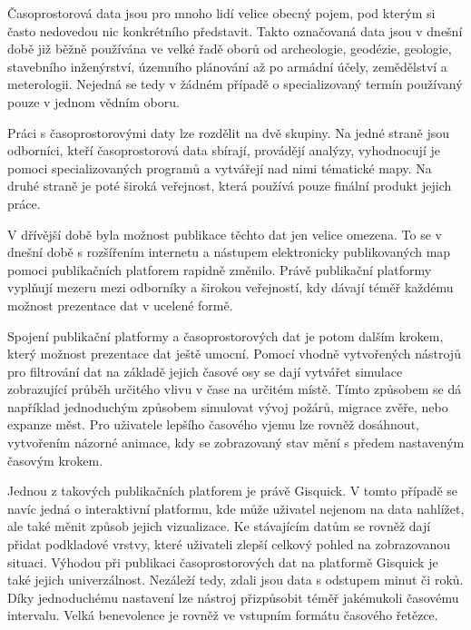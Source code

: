 
Časoprostorová data jsou pro mnoho lidí velice obecný pojem, pod
kterým si často nedovedou nic konkrétního představit. Takto označovaná
data jsou v dnešní době již běžně používána ve velké řadě oborů od
archeologie, geodézie, geologie, stavebního inženýrství, územního
plánování až po armádní účely, zemědělství a meterologii. Nejedná se
tedy v žádném případě o specializovaný termín používaný pouze v jednom
vědním oboru.

Práci s časoprostorovými daty lze rozdělit na dvě skupiny. Na jedné straně
jsou odborníci, kteří časoprostorová data sbírají, provádějí analýzy,
vyhodnocují je pomoci specializovaných programů a vytvářejí nad nimi
tématické mapy. Na druhé straně je poté široká veřejnost, která
používá pouze finální produkt jejich práce.

V dřívější době byla možnost publikace těchto dat jen velice
omezena. To se v dnešní době s rozšířením internetu a nástupem
elektronicky publikovaných map pomoci publikačních platforem rapidně
změnilo. Právě publikační platformy vyplňují mezeru mezi odborníky a
širokou veřejností, kdy dávají téměř každému možnost prezentace dat v
ucelené formě.


Spojení publikační platformy a časoprostorových dat je potom dalším
krokem, který možnost prezentace dat ještě umocní. Pomocí vhodně
vytvořených nástrojů pro filtrování dat na základě jejich časové osy
se dají vytvářet simulace zobrazující průběh určitého vlivu v čase na
určitém místě. Tímto způsobem se dá například jednoduchým způsobem
simulovat vývoj požárů, migrace zvěře, nebo expanze měst. Pro
uživatele lepšího časového vjemu lze rovněž dosáhnout, vytvořením
názorné animace, kdy se zobrazovaný stav mění s předem nastaveným
časovým krokem.

Jednou z takových publikačních platforem je právě Gisquick. V tomto
případě se navíc jedná o interaktivní platformu, kde může uživatel
nejenom na data nahlížet, ale také měnit způsob jejich vizualizace. Ke
stávajícím datům se rovněž dají přidat podkladové vrstvy, které
uživateli zlepší celkový pohled na zobrazovanou situaci. Výhodou při
publikaci časoprostorových dat na platformě Gisquick je také jejich
univerzálnost. Nezáleží tedy, zdali jsou data s odstupem minut či
roků. Díky jednoduchému nastavení lze nástroj přizpůsobit téměř
jakémukoli časovému intervalu. Velká benevolence je rovněž ve vstupním
formátu časového řetězce.

